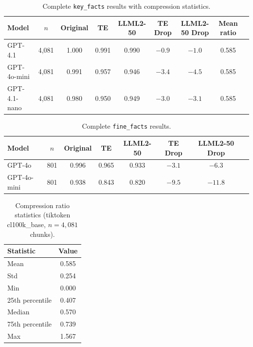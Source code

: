 \documentclass{article}
\begin{document}
\begin{table}[h]
  \caption{Complete \texttt{key\_facts} results with compression statistics.}
  \label{tab:a1}
  \centering
  \small
  \begin{tabular}{lcccccccc}
    \toprule
    Model & $n$ & Original & TE & LLML2-50 & TE Drop & LLML2-50 Drop & Mean ratio \\
    \midrule
    GPT-4.1       & 4{,}081 & 1.000 & 0.991 & 0.990 & $-0.9$ & $-1.0$ & 0.585 \\
    GPT-4o-mini   & 4{,}081 & 0.991 & 0.957 & 0.946 & $-3.4$ & $-4.5$ & 0.585 \\
    GPT-4.1-nano  & 4{,}081 & 0.980 & 0.950 & 0.949 & $-3.0$ & $-3.1$ & 0.585 \\
    \bottomrule
  \end{tabular}
\end{table}

\begin{table}[h]
  \caption{Complete \texttt{fine\_facts} results.}
  \label{tab:a2}
  \centering
  \small
  \begin{tabular}{lccccccc}
    \toprule
    Model & $n$ & Original & TE & LLML2-50 & TE Drop & LLML2-50 Drop \\
    \midrule
    GPT-4o      & 801 & 0.996 & 0.965 & 0.933 & $-3.1$ & $-6.3$ \\
    GPT-4o-mini & 801 & 0.938 & 0.843 & 0.820 & $-9.5$ & $-11.8$ \\
    \bottomrule
  \end{tabular}
\end{table}

\begin{table}[h]
  \caption{Compression ratio statistics (tiktoken cl100k\_base, $n=4{,}081$ chunks).}
  \label{tab:a3}
  \centering
  \small
  \begin{tabular}{lc}
    \toprule
    Statistic & Value \\
    \midrule
    Mean & 0.585 \\
    Std & 0.254 \\
    Min & 0.000 \\
    25th percentile & 0.407 \\
    Median & 0.570 \\
    75th percentile & 0.739 \\
    Max & 1.567 \\
    \bottomrule
  \end{tabular}
\end{table}
\end{document}

